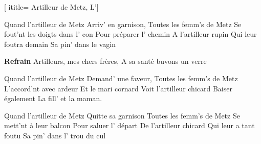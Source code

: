 [
ititle={ Artilleur de Metz, L'}]


\beginverse
Quand l'artilleur de Metz
Arriv' en garnison,
Toutes les femm's de Metz
Se fout'nt les doigts dans l' con
Pour préparer l' chemin
A l'artilleur rupin
Qui leur foutra demain
Sa pin' dans le vagin
\endverse

\beginchorus
\textbf {Refrain}
Artilleurs, mes chers frères,
A sa santé buvons un verre
\endchorus

\beginverse
Quand l'artilleur de Metz
Demand' une faveur,
Toutes les femm's de Metz
L'accord'nt avec ardeur
Et le mari cornard
Voit l'artilleur chicard
Baiser également
La fill' et la maman.
\endverse

\beginverse
Quand l'artilleur de Metz
Quitte sa garnison
Toutes les femm's de Metz
Se mett'nt à leur balcon
Pour saluer l' départ
De l'artilleur chicard
Qui leur a tant foutu
Sa pin' dans l' trou du cul
\endverse

\endsong